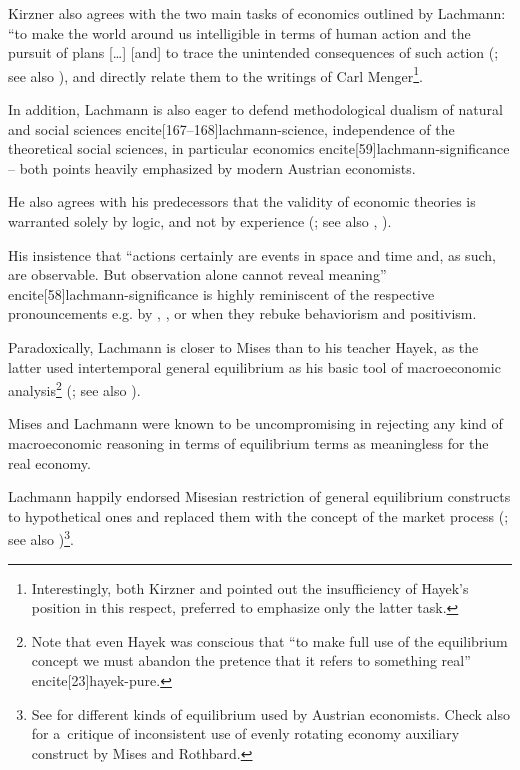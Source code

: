 {Kirzner also agrees with the two main tasks of economics outlined by Lachmann: ``to make the world around us intelligible in terms of human action and the pursuit of plans [\ldots] [and] to trace the unintended consequences of such action (\cite[41]{kirzner-method}; see also \cite[261--262]{lachmann-hicks-neo}), and directly relate them to the writings of Carl Menger\footnote{Interestingly, both Kirzner and \textcite[66--67]{rothbard-praxeology} pointed out the insufficiency of Hayek's position in this respect, preferred to emphasize only the latter task.}.



In addition, Lachmann is also eager to defend methodological dualism of natural and social sciences encite[167--168]{lachmann-science}, independence of the theoretical social sciences, in particular economics encite[59]{lachmann-significance} -- both points heavily emphasized by modern Austrian economists.

He also agrees with his predecessors that the validity of economic theories is warranted solely by logic, and not by experience (\cite[58]{lachmann-significance}; see also \cite[41]{mises-ha}, \cite[21, 31--32]{rothbard-praxeology}).

His insistence that ``actions certainly are events in space and time and, as such, are observable. But observation alone cannot reveal meaning'' encite[58]{lachmann-significance} is highly reminiscent of the respective pronouncements e.g. by \textcite[26]{mises-ha}, \citeyear[245]{mises-theory}, or \textcite[63--64]{hoppe} when they rebuke behaviorism and positivism.



Paradoxically, Lachmann is closer to Mises than to his teacher Hayek, as the latter used intertemporal general equilibrium as his basic tool of macroeconomic analysis\footnote{Note that even Hayek was conscious that ``to make full use of the equilibrium concept we must abandon the pretence that it refers to something real'' encite[23]{hayek-pure}.} (\cite[190]{lachmann-hayek}; see also \cite{lachmann-hayek-sraffa}).

Mises and Lachmann were known to be uncompromising in rejecting any kind of macroeconomic reasoning in terms of equilibrium terms as meaningless for the real economy.

Lachmann happily endorsed Misesian restriction of general equilibrium constructs to hypothetical ones and replaced them with the concept of the market process (\cite[183]{lachmann-mises-process}; see also \cite[230--231]{mises-planning})\footnote{See \textcite{salerno-equilibrium} for different kinds of equilibrium used by Austrian economists. Check also \textcite{cowen-ere} for a~critique of inconsistent use of evenly rotating economy auxiliary construct by Mises and Rothbard.}.



}
